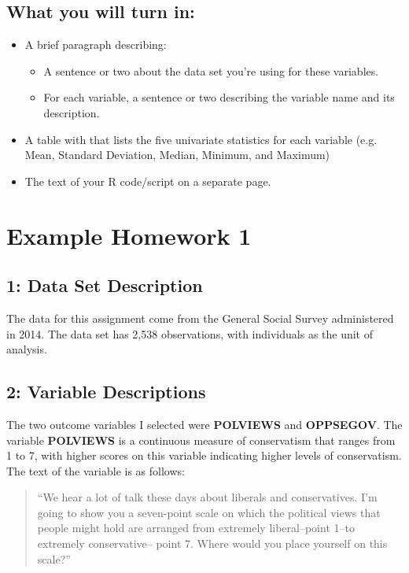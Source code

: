 \documentclass{article}
\begin{document}
\subsection*{What you will turn in:}
\begin{itemize}
\item A brief paragraph describing:
	\begin{itemize}
	\item A sentence or two about the data set you're using for these variables.
	\item For each variable, a sentence or two describing the variable name and its description.
	\end{itemize}	
\item A table with that lists the five univariate statistics for each variable (e.g. Mean, Standard Deviation, Median, Minimum, and Maximum)
\item The text of your R code/script on a separate page.
\end{itemize}

\newpage
\section*{\center Example Homework 1}

\subsection*{1: Data Set Description}
The data for this assignment come from the General Social Survey administered in 2014. The data set has 2,538 observations, with individuals as the unit of analysis. \newline

\subsection*{2: Variable Descriptions}
The two outcome variables I selected were \textbf{POLVIEWS} and \textbf{OPPSEGOV}. The variable \textbf{POLVIEWS} is a continuous measure of conservatism that ranges from 1 to 7, with higher scores on this variable indicating higher levels of conservatism. The text of the variable is as follows:
\begin{quote}
``We hear a lot of talk these days about liberals and conservatives. I'm going to show you a seven-point scale on which the political views that people might hold are arranged from extremely liberal--point 1--to extremely conservative-- point 7. Where would you place yourself on this scale?''
\end{quote}
\end{document}

